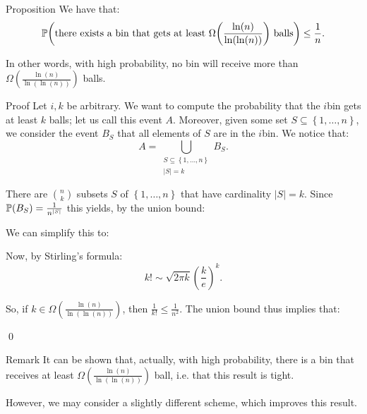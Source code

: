 \documentclass[a4paper]{article}
\begin{document}
\begin{parag}{Proposition}
    We have that:
    \[\prob\left(\text{there exists a bin that gets at least $\Omega\left(\frac{\ln\left(n\right)}{\ln\left(\ln\left(n\right)\right)}\right)$ balls}\right) \leq \frac{1}{n}.\]

    In other words, with high probability, no bin will receive more than $\Omega\left(\frac{\ln\left(n\right)}{\ln\left(\ln\left(n\right)\right)}\right)$ balls.

    \begin{subparag}{Proof}
        Let $i, k$  be arbitrary. We want to compute the probability that the $i$\Th bin gets at least $k$ balls; let us call this event $A$. Moreover, given some set $S \subseteq \left\{1, \ldots, n\right\}$, we consider the event $B_S$ that all elements of $S$ are in the $i$\Th bin. We notice that: 
        \[A = \bigcup_{\substack{S \subseteq \left\{1, \ldots, n\right\} \\ \left|S\right| = k}} B_S.\]

        There are $\binom{n}{k}$ subsets $S$ of $\left\{1, \ldots, n\right\}$ that have cardinality $\left|S\right| = k$. Since $\prob\left(B_S\right) = \frac{1}{n^{\left|S\right|}}$ this yields, by the union bound:
        
        We can simplify this to:
        
        Now, by Stirling's formula: 
        \[k! \sim \sqrt{2\pi k} \left(\frac{k}{e}\right)^k.\]

        So, if $k \in \Omega\left(\frac{\ln\left(n\right)}{\ln\left(\ln\left(n\right)\right)}\right)$, then $\frac{1}{k!} \leq \frac{1}{n^2}$. The union bound thus implies that:
        
        \qed
    \end{subparag}

    \begin{subparag}{Remark}
        It can be shown that, actually, with high probability, there is a bin that receives at least $\Omega\left(\frac{\ln\left(n\right)}{\ln\left(\ln\left(n\right)\right)}\right)$ ball, i.e. that this result is tight.

        However, we may consider a slightly different scheme, which improves this result.
    \end{subparag}
\end{parag}
\end{document}
